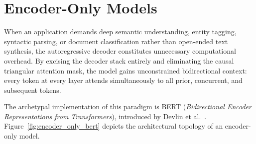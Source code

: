 \documentclass[../../main.tex]{subfiles}
\begin{document}
\section{Encoder-Only Models}
\label{sec:encoder_only_bert}

When an application demands deep semantic understanding, entity tagging, syntactic parsing, or document classification rather than open-ended text synthesis, the autoregressive decoder constitutes unnecessary computational overhead. By excising the decoder stack entirely and eliminating the causal triangular attention mask, the model gains unconstrained bidirectional context: every token at every layer attends simultaneously to all prior, concurrent, and subsequent tokens.

The archetypal implementation of this paradigm is BERT (\emph{Bidirectional Encoder Representations from Transformers}), introduced by Devlin et al.~\cite{devlin2019}. Figure~\ref{fig:encoder_only_bert} depicts the architectural topology of an encoder-only model.
\end{document}
